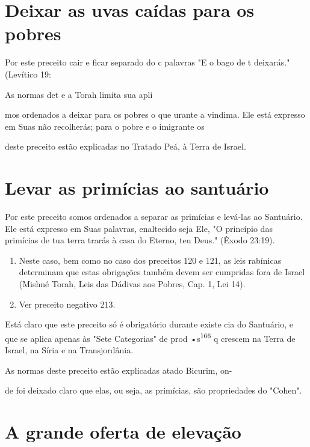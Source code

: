 \begin{itemize}
\begin{enumrate}
\begin{itemize}
\begin{itemize}
\begin{itemize}
\section{Deixar as uvas caídas para os pobres}


Por este preceito cair e ficar separado do c palavras "E o bago de t
deixarás." (Levítico 19:

As normas det e a Torah limita sua apli

mos ordenados a deixar para os pobres o que urante a vindima. Ele está
expresso em Suas não recolherás; para o pobre e o imigrante os

deste preceito estão explicadas no Tratado Peá, à Terra de Israel.

\section{Levar as primícias ao santuário}


Por este preceito somos ordenados a separar as primícias e levá-las ao
Santuário. Ele está expresso em Suas palavras, enaltecido seja Ele, "O
princí­pio das primícias de tua terra trarás à casa do Eterno, teu
Deus." (Êxodo 23:19).


\begin{enumerate}
\def\labelenumi{\arabic{enumi}.}
\setcounter{enumi}{163}
\item
 
 Neste caso, bem como no caso dos preceitos 120 e 121, as leis
 rabínicas determinam que estas obrigações também devem ser cumpridas
 fora de Israel (Mishné Torah, Leis das Dádivas aos Po­bres, Cap. 1,
 Lei 14).
 
\item
 
 Ver preceito negativo 213.
 
\end{enumerate}




Está claro que este preceito só é obrigatório durante existe cia do
Santuário, e que se aplica apenas às "Sete Categorias" de prod
•s\textsuperscript{166} q crescem na Ter­ra de Israel, na Síria e na
Transjordânia.

As normas deste preceito estão explicadas atado Bicurim, on-


de foi deixado claro que elas, ou seja, as primícias, são propriedades
do "Cohen".


\section{A grande oferta de elevação}


\end{itemize}
\end{itemize}
\end{itemize}
\end{enumrate}
\end{itemize}

